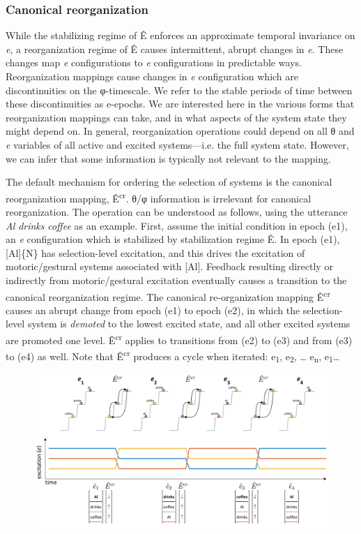 \subsubsection{Canonical reorganization}

While the stabilizing regime of Ê enforces an approximate temporal invariance on \textit{e}, a reorganization regime of Ê causes intermittent, abrupt changes in \textit{e}. These changes map \textit{e} configurations to \textit{e} configurations in predictable ways. Reorganization mappings cause changes in \textit{e} configuration which are discontinuities on the φ-timescale. We refer to the stable periods of time between these discontinuities as e-epochs. We are interested here in the various forms that reorganization mappings can take, and in what aspects of the system state they might depend on. In general, reorganization operations could depend on all θ and \textit{e} variables of all active and excited systems—i.e. the full system state. However, we can infer that some information is typically not relevant to the mapping. 

  The default mechanism for ordering the selection of systems is the canonical reorganization mapping, Ê\textsuperscript{cr}. θ/φ information is irrelevant for canonical reorganization. The operation  can be understood as follows, using the utterance \textit{Al} \textit{drinks} \textit{coffee} as an example. First, assume the initial condition in epoch (e1), an \textit{e} configuration which is stabilized by stabilization regime Ê. In epoch (e1), [Al]\{N\} has selection-level excitation, and this drives the excitation of motoric/gestural systems associated with [Al]. Feedback resulting directly or indirectly from motoric/gestural excitation eventually causes a transition to the canonical reorganization regime. The canonical re-organization mapping Ê\textsuperscript{cr} causes an abrupt change from epoch (e1) to epoch (e2), in which the selection-level system is \textit{demoted} to the lowest excited state, and all other excited systems are promoted one level. Ê\textsuperscript{cr} applies to transitions from (e2) to (e3) and from (e3) to (e4) as well. Note that Ê\textsuperscript{cr} produces a cycle when iterated: e\textsubscript{1}, e\textsubscript{2}, … e\textsubscript{n}, e\textsubscript{1}… 

  
\begin{figure}
\includegraphics[width=\textwidth]{figures/Tilsen-img25.png}
\caption{\missingcaption}
\label{fig:}
\end{figure}
 

